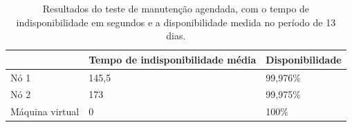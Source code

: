 \begin{table}[h!]
\caption{Resultados do teste de manutenção agendada, com o tempo de indisponibilidade em segundos e a disponibilidade medida no período de 13 dias.}
\small
\label{tab:teste3resultados}
\begin{center}
\begin{tabular}{|l|p{7cm}|p{4cm}|}\hline
 & \textbf{Tempo de indisponibilidade média} & \textbf{Disponibilidade} \\\hline
Nó 1 & 145,5 & 99,976\% \\\hline
Nó 2 & 173 & 99,975\% \\\hline
Máquina virtual & 0 & 100\% \\\hline
\end{tabular}
\end{center}
\end{table}



